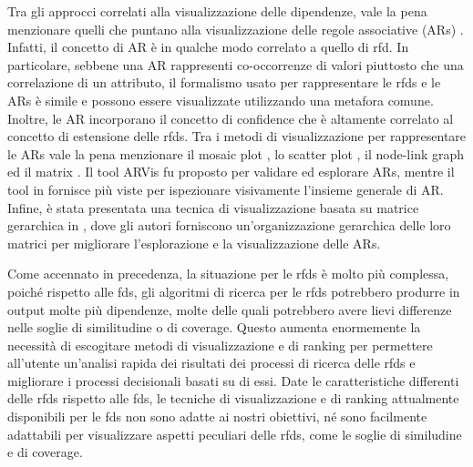 Tra gli approcci correlati alla visualizzazione delle dipendenze, vale la pena menzionare quelli che puntano alla visualizzazione delle regole associative (ARs) \cite{chenvisualanalysis,visualassrules,wifisviz,assocexplorer}. Infatti, il concetto di AR \`{e} in qualche modo correlato a quello di \acrshort{rfd}. In particolare, sebbene una AR rappresenti co-occorrenze di valori piuttosto che una correlazione di un attributo, il formalismo usato per rappresentare le \acrshort{rfds} e le ARs \`{e} simile e possono essere visualizzate utilizzando una metafora comune. Inoltre, le AR incorporano il concetto di confidence che \`{e} altamente correlato al concetto di estensione delle \acrshort{rfds}. Tra i metodi di visualizzazione per rappresentare le ARs vale la pena menzionare il mosaic plot \cite{visualassrules}, lo scatter plot \cite{assocexplorer}, il node-link graph \cite{wifisviz} ed il matrix \cite{vaet}. Il tool ARVis fu proposto per validare ed esplorare ARs, mentre il tool in \cite{visualassrulesusingmatrix} fornisce pi\`{u} viste per ispezionare visivamente l'insieme generale di AR. Infine, \`{e} stata presentata una tecnica di visualizzazione basata su matrice gerarchica in \cite{chenvisualanalysis}, dove gli autori forniscono un'organizzazione gerarchica delle loro matrici per migliorare l'esplorazione e la visualizzazione delle ARs.\par
Come accennato in precedenza, la situazione per le \acrshort{rfds} \`{e} molto pi\`{u} complessa, poich\'{e} rispetto alle \acrshort{fds}, gli algoritmi di ricerca per le \acrshort{rfds} potrebbero produrre in output molte pi\`{u} dipendenze, molte delle quali potrebbero avere lievi differenze nelle soglie di similitudine o di coverage. Questo aumenta enormemente la necessit\`{a} di escogitare metodi di visualizzazione e di ranking per permettere all'utente un'analisi rapida dei risultati dei processi di ricerca delle \acrshort{rfds} e migliorare i processi decisionali basati su di essi. Date le caratteristiche differenti delle \acrshort{rfds} rispetto alle \acrshort{fds}, le tecniche di visualizzazione e di ranking attualmente disponibili per le \acrshort{fds} non sono adatte ai nostri obiettivi, n\'{e} sono facilmente adattabili per visualizzare aspetti peculiari delle \acrshort{rfds}, come le soglie di similudine e di coverage.

\newpage